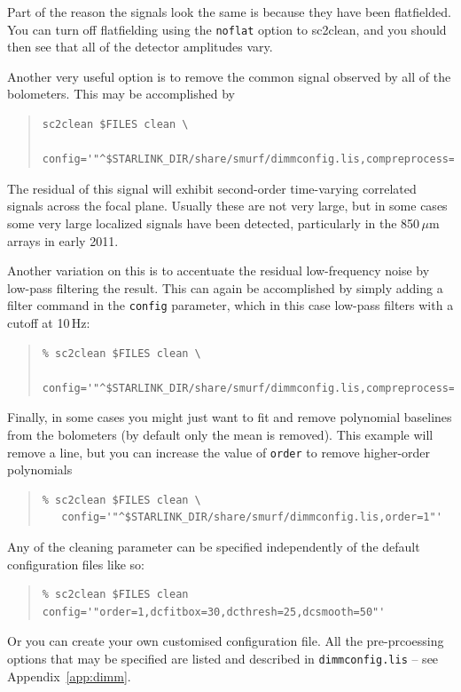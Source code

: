 \documentclass[twoside,11pt]{article}
\newcommand{\xref}[3]{#1}
\renewcommand{\_}{\texttt{\symbol{95}}}
\newenvironment{myquote}{\begin{quote}\begin{small}}{\end{small}\end{quote}}
\newcommand{\task}[1]{\textsf{#1}}
\newcommand{\clean}{\xref{\task{sc2clean}}{sun258}{SC2CLEAN}}
\begin{document}
Part of the reason the signals look the same is because they have been
flatfielded. You can turn off flatfielding using the \texttt{noflat}
option to \clean, and you should then see that all of the detector
amplitudes vary.

Another very useful option is to remove the common signal observed by
all of the bolometers. This may be accomplished by

\begin{myquote}
\begin{verbatim}
sc2clean $FILES clean \
   config='"^$STARLINK_DIR/share/smurf/dimmconfig.lis,compreprocess=1"'
\end{verbatim}
\end{myquote}

The residual of this signal will exhibit second-order time-varying
correlated signals across the focal plane. Usually these are not very
large, but in some cases some very large localized signals have been
detected, particularly in the 850\,$\mu$m arrays in early 2011.

Another variation on this is to accentuate the residual low-frequency
noise by low-pass filtering the result. This can again be accomplished
by simply adding a filter command in the \texttt{config} parameter,
which in this case low-pass filters with a cutoff at 10\,Hz:

\begin{myquote}
\begin{verbatim}
% sc2clean $FILES clean \
   config='"^$STARLINK_DIR/share/smurf/dimmconfig.lis,compreprocess=1,filt_edgelow=10"'
\end{verbatim}
\end{myquote}

Finally, in some cases you might just want to fit and remove
polynomial baselines from the bolometers (by default only the mean is
removed). This example will remove a line, but you can increase the
value of \texttt{order} to remove higher-order polynomials

\begin{myquote}
\begin{verbatim}
% sc2clean $FILES clean \
   config='"^$STARLINK_DIR/share/smurf/dimmconfig.lis,order=1"'
\end{verbatim}
\end{myquote}

Any of the cleaning parameter can be specified independently of the
default configuration files like so:
\begin{myquote}
\begin{verbatim}
% sc2clean $FILES clean config='"order=1,dcfitbox=30,dcthresh=25,dcsmooth=50"'
\end{verbatim}
\end{myquote}
Or you can create your own customised configuration file. All the
pre-prcoessing options that may be specified are listed and described
in \texttt{dimmconfig.lis} -- see Appendix~\ref{app:dimm}.
\end{document}
